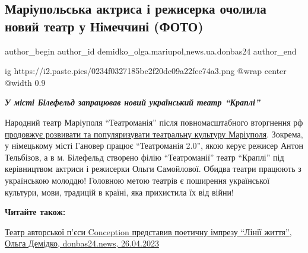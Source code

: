  
 
 
 
 
 
\subsection{Маріупольська актриса і режисерка очолила новий театр у Німеччині (ФОТО)}
\label{sec:27_06_2023.stz.news.ua.donbas24.1.mariupol_aktrisa_rezhiserka_teatr_bielefeld_krapli}
 
\ifcmt
 author_begin
   author_id demidko_olga.mariupol,news.ua.donbas24
 author_end
\fi

\ifcmt
  ig https://i2.paste.pics/0234f0327185bc2f20dc09a22fee74a3.png
  @wrap center
  @width 0.9
\fi

\begin{center}
  \em\color{blue}\bfseries\Large
  У місті Білефельд запрацював новий український театр \enquote{Краплі} 
\end{center}

Народний театр Маріуполя \enquote{Театроманія} після повномасштабного
вторгнення рф
\href{https://archive.org/details/08_06_2023.demidko_olga.donbas24.mariupol_aktrisa_virshi_nimecchyna_vystupy_olga_samojlova}{продовжує
розвивати та популяризувати театральну культуру Маріуполя}. Зокрема, у
німецькому місті Гановер працює \enquote{Театроманія 2.0}, якою керує режисер
Антон Тельбізов, а в м. Білефельд створено філію \enquote{Театроманії} театр
\enquote{Краплі} під керівництвом актриси і режисерки Ольги Самойлової. Обидва
театри працюють з українською молоддю! Головною метою театрів є поширення
української культури, мови, традицій в країні, яка прихистила їх від війни!

\textbf{Читайте також:} 

\href{https://archive.org/details/26_04_2023.demidko_olga.donbas24.teatr_conception_linii_zhyttja}{%
Театр авторської п'єси Conception представив поетичну імпрезу \enquote{Лінії життя}, %
Ольга Демідко, donbas24.news, 26.04.2023%
}

